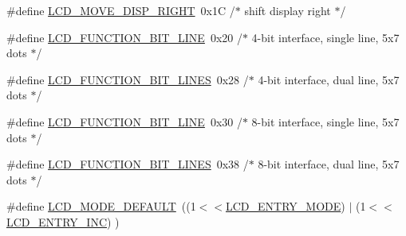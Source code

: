 \begin{DoxyCompactItemize}
\item 
\#define \mbox{\hyperlink{group__pfleury__lcd_ga9a90bb926f5ba59378af81fe8e246ffb}{L\+C\+D\+\_\+\+M\+O\+V\+E\+\_\+\+D\+I\+S\+P\+\_\+\+R\+I\+G\+HT}}~0x1\+C   /$\ast$ shift display right                    $\ast$/
\item 
\#define \mbox{\hyperlink{group__pfleury__lcd_gaff4e5baa36a0322eb97557dcb18cd96e}{L\+C\+D\+\_\+\+F\+U\+N\+C\+T\+I\+O\+N\+\_\+B\+I\+T\+\_\+L\+I\+NE}}~0x20   /$\ast$ 4-\/bit interface, single line, 5x7 dots $\ast$/
\item 
\#define \mbox{\hyperlink{group__pfleury__lcd_gab35032ab368a8bc90798e0c547fb24c2}{L\+C\+D\+\_\+\+F\+U\+N\+C\+T\+I\+O\+N\+\_\+B\+I\+T\+\_\+L\+I\+N\+ES}}~0x28   /$\ast$ 4-\/bit interface, dual line,   5x7 dots $\ast$/
\item 
\#define \mbox{\hyperlink{group__pfleury__lcd_gaa8aeee098cb4c84ec420e00d054abcce}{L\+C\+D\+\_\+\+F\+U\+N\+C\+T\+I\+O\+N\+\_\+B\+I\+T\+\_\+L\+I\+NE}}~0x30   /$\ast$ 8-\/bit interface, single line, 5x7 dots $\ast$/
\item 
\#define \mbox{\hyperlink{group__pfleury__lcd_ga160a214f47869f8f98ad5add3a7568db}{L\+C\+D\+\_\+\+F\+U\+N\+C\+T\+I\+O\+N\+\_\+B\+I\+T\+\_\+L\+I\+N\+ES}}~0x38   /$\ast$ 8-\/bit interface, dual line,   5x7 dots $\ast$/
\item 
\#define \mbox{\hyperlink{group__pfleury__lcd_ga1849e2087d3034a3fffa67444beed109}{L\+C\+D\+\_\+\+M\+O\+D\+E\+\_\+\+D\+E\+F\+A\+U\+LT}}~((1$<$$<$\mbox{\hyperlink{group__pfleury__lcd_gae5d757ddb6d94de8c82191b60b40e442}{L\+C\+D\+\_\+\+E\+N\+T\+R\+Y\+\_\+\+M\+O\+DE}}) $\vert$ (1$<$$<$\mbox{\hyperlink{group__pfleury__lcd_gada766266a0be0d0040fbf86e23b58aa6}{L\+C\+D\+\_\+\+E\+N\+T\+R\+Y\+\_\+\+I\+NC}}) )
\end{DoxyCompactItemize}
